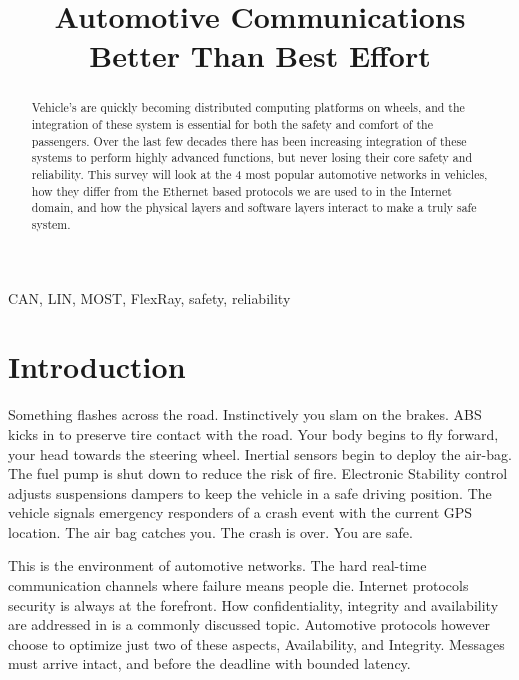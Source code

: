 \documentclass[conference,12pt]{IEEEtran}
\begin{document}
%
\title{Automotive Communications \\ \large{Better Than Best Effort}}

\author{
}
\maketitle
\begin{abstract}
Vehicle's are quickly becoming distributed computing platforms on wheels, and
the integration of these system is essential for both the safety and comfort of
the passengers. Over the last few decades there has been increasing integration
of these systems to perform highly advanced functions, but never losing their
core safety and reliability. This survey will look at the 4 most
popular automotive networks in vehicles, how they differ from the Ethernet based
protocols we are used to in the Internet domain, and how the physical layers and
software layers interact to make a truly safe system. 
\end{abstract}

\begin{IEEEkeywords}
CAN, LIN, MOST, FlexRay, safety, reliability
\end{IEEEkeywords}

\section{Introduction}

Something flashes across the road. Instinctively you slam on the brakes. ABS
kicks in to preserve tire contact with the road. Your body begins to fly
forward, your head towards the steering wheel. Inertial sensors begin to deploy
the air-bag. The fuel pump is shut down to reduce the
risk of fire. Electronic Stability control adjusts suspensions dampers to keep the vehicle
 in a safe driving position. The vehicle signals emergency responders
of a crash event with the current GPS location. The air bag catches you.
The crash is over. You are safe. 

This is the environment of automotive networks.
The hard real-time communication channels where failure means people die.
Internet protocols security is always at the forefront. How confidentiality,
integrity and availability are addressed in is a commonly discussed topic.
Automotive protocols however choose to optimize just two of these aspects, Availability, and Integrity.
Messages must arrive intact, and before the deadline with bounded latency.
\end{document}
